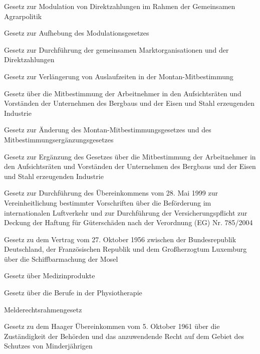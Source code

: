 \item[{ModG}] Gesetz zur Modulation von Direktzahlungen im Rahmen der Gemeinsamen Agrarpolitik

\item[{ModGAufhG}] Gesetz zur Aufhebung des Modulationsgesetzes

\item[{MOG}] Gesetz zur Durchführung der gemeinsamen Marktorganisationen und der Direktzahlungen

\item[{MontanMitbestAlzVerlG}] Gesetz zur Verlängerung von Auslaufzeiten in der Montan-Mitbestimmung

\item[{MontanMitbestG}] Gesetz über die Mitbestimmung der Arbeitnehmer in den Aufsichtsräten und Vorständen der Unternehmen des Bergbaus und der Eisen und Stahl erzeugenden Industrie

\item[{MontanMitbestG-ErgGÄndG}] Gesetz zur Änderung des Montan-Mitbestimmungsgesetzes und des Mitbestimmungsergänzungsgesetzes

\item[{MontanMitbestGErgG}] Gesetz zur Ergänzung des Gesetzes über die Mitbestimmung der Arbeitnehmer in den Aufsichtsräten und Vorständen der Unternehmen des Bergbaus und der Eisen und Stahl erzeugenden Industrie

\item[{MontÜG}] Gesetz zur Durchführung des Übereinkommens vom 28. Mai 1999 zur Vereinheitlichung bestimmter Vorschriften über die Beförderung im internationalen Luftverkehr und zur Durchführung der Versicherungspflicht zur Deckung der Haftung für Güterschäden nach der Verordnung (EG) Nr. 785/2004

\item[{MoselVtrFRA-LUXG}] Gesetz zu dem Vertrag vom 27. Oktober 1956 zwischen der Bundesrepublik Deutschland, der Französischen Republik und dem Großherzogtum Luxemburg über die Schiffbarmachung der Mosel

\item[{MPG}] Gesetz über Medizinprodukte

\item[{MPhG}] Gesetz über die Berufe in der Physiotherapie

\item[{MRRG}] Melderechtsrahmengesetz

\item[{MSAG}] Gesetz zu dem Haager Übereinkommen vom 5. Oktober 1961 über die Zuständigkeit der Behörden und das anzuwendende Recht auf dem Gebiet des Schutzes von Minderjährigen

